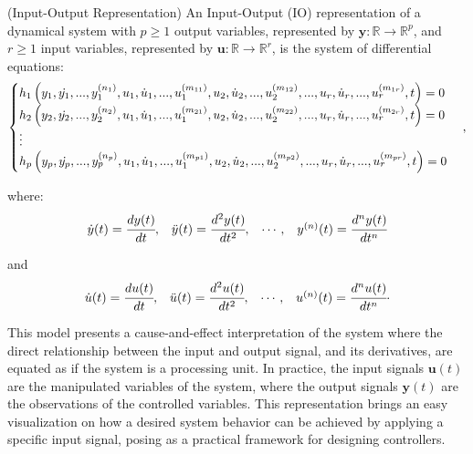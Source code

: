 \documentclass[a4paper,11pt]{book}
\numberwithin{figure}{chapter}
\numberwithin{equation}{chapter}
\numberwithin{table}{chapter}
\theoremstyle{definition}
\newtheorem{definition}{Definition}[chapter]
\newcounter{boxed-theorem}
\newcounter{boxed-definition}
\newenvironment{boxed-definition}[1]
{\colorlet{shadecolor}{pastelYellow!15} \begin{shaded} \begin{definition}{#1}}
{\end{definition} \end{shaded}}
\newcounter{boxed-example}
\begin{document}
\begin{boxed-definition}{(Input-Output Representation)} \label{def:IORepr01}
    An Input-Output (IO) representation of a dynamical system with $p \geq 1$ output variables, represented by $\bm{y} : \mathbb{R} \rightarrow \mathbb{R}^{p}$, and $r \geq 1$ input variables, represented by $\bm{u} : \mathbb{R} \rightarrow \mathbb{R}^{r}$, is the system of differential equations:
    \begin{equation} \label{eq:IERepr01}
    \begin{cases}
        h_1 \left( y_1, \dot{y_1}, ..., y_1^{(n_1)}, u_1, \dot{u}_1, ..., u^{(m_{11})}_1, u_2, \dot{u}_2, ..., u^{(m_{12})}_2, ..., u_r, \dot{u}_r, ..., u^{(m_{1r})}_r, t   \right) = 0 & \\
        h_2 \left( y_2, \dot{y_2}, ..., y_2^{(n_2)}, u_1, \dot{u}_1, ..., u^{(m_{21})}_1, u_2, \dot{u}_2, ..., u^{(m_{22})}_2, ..., u_r, \dot{u}_r, ..., u^{(m_{2r})}_r, t   \right) = 0 & \\
         \vdots \hfill & \\
        h_p \left( y_p, \dot{y_p}, ..., y_p^{(n_p)}, u_1, \dot{u}_1, ..., u^{(m_{p1})}_1, u_2, \dot{u}_2, ..., u^{(m_{p2})}_2, ..., u_r, \dot{u}_r, ..., u^{(m_{pr})}_r, t   \right) = 0 &
    \end{cases}
    ,\end{equation}
    
    \noindent where:
    \begin{equation*}
    \begin{matrix}
        \dot{y}(t) = \cfrac{d y(t)}{dt}, & \ddot{y}(t) = \cfrac{d^2 y(t)}{dt^2}, & \cdots, & y^{(n)}(t) = \cfrac{d^n y(t)}{dt^n}
    \end{matrix}
    \end{equation*}

	\noindent and    
    \begin{equation*}
    \begin{matrix}
        \dot{u}(t) = \cfrac{d u(t)}{dt}, & \ddot{u}(t) = \cfrac{d^2 u(t)}{dt^2}, & \cdots, & u^{(n)}(t) = \cfrac{d^n u(t)}{dt^n}
    \end{matrix}
    .\end{equation*}
\end{boxed-definition}

This model presents a cause-and-effect interpretation of the system where the direct relationship between the input and output signal, and its derivatives, are equated as if the system is a processing unit. In practice, the input signals $\bm{u}(t)$ are the manipulated variables of the system, where the output signals $\bm{y}(t)$ are the observations of the controlled variables. This representation brings an easy visualization on how a desired system behavior can be achieved by applying a specific input signal, posing as a practical framework for designing controllers. 
\end{document}
